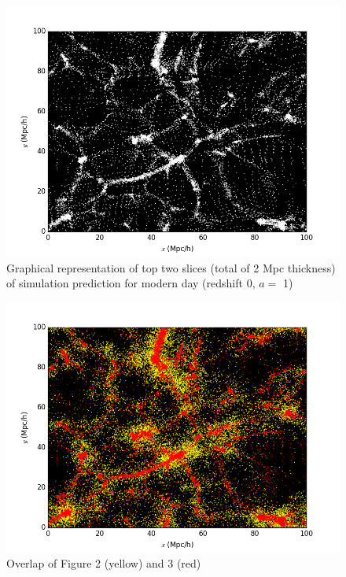 \documentclass[12pt]{article}   	%
\begin{document}
\begin{figure}[h!]
\centering
\includegraphics[scale=0.85]{final100.png}
\caption{Graphical representation of top two slices (total of 2 Mpc thickness) of simulation prediction for 
modern day (redshift 0, $a =$ 1)}
\end{figure}
\begin{figure}[h!]
\centering
\includegraphics[scale=0.85]{RZoverlap100.png}
\caption{Overlap of Figure 2 (yellow) and 3 (red)}
\end{figure}
\end{document}
